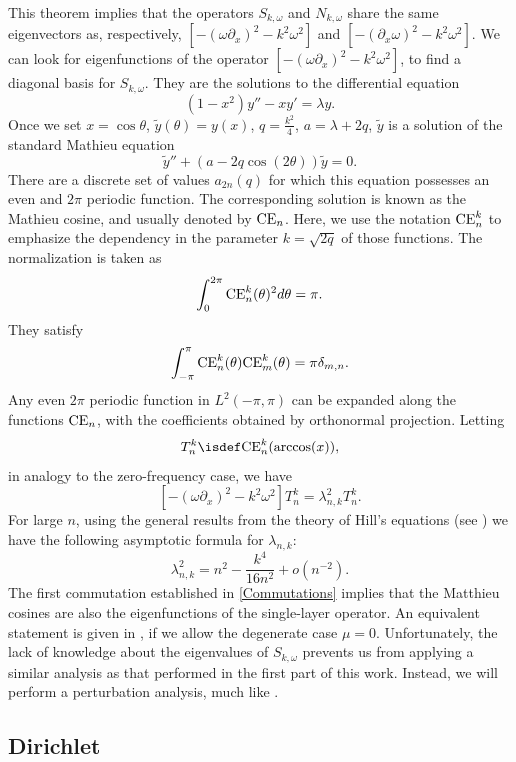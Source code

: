 \documentclass[a4paper]{article}
\begin{document}
	This theorem implies that the operators $S_{k,\omega}$ and $N_{k,\omega}$ share the same eigenvectors as, respectively, $\left[-(\omega \partial_x)^2 - k^2\omega^2\right]$ and $ \left[-(\partial_x \omega)^2 - k^2\omega^2\right]$. We can look for eigenfunctions of the operator $\left[ -(\omega \partial_x)^2 - k^2\omega^2\right]$, to find a diagonal basis for $S_{k,\omega}$. They are the solutions to the differential equation 
	\[ (1-x^2) y'' - x y' = \lambda y.\]
	Once we set $x = \cos \theta$, $\tilde{y}(\theta) = y(x)$,  $q = \frac{k^2}{4}$, $a = \lambda + 2q$, $\tilde{y}$ is a solution of the standard Mathieu equation 
	\[\tilde{y}'' + (a - 2q \cos(2\theta)) \tilde{y} = 0.\]
	There are a discrete set of values $a_{2n}(q)$ for which this equation possesses an even and $2\pi$ periodic function. The corresponding solution is known as the Mathieu cosine, and usually denoted by $\textup{CE}_n$. 	Here, we use the notation $\textup{CE}^k_n$ to emphasize the dependency in the parameter $k = \sqrt{2q}$ of those functions. The normalization is taken as
	\[ \int_{0}^{2\pi} \textup{CE}^k_n(\theta)^2 d\theta = \pi.\]
 	They satisfy
	\[ \int_{-\pi}^{\pi}\textup{CE}^k_n(\theta) \textup{CE}^k_m(\theta) = \pi \delta_{m,n}.\]
	Any even $2\pi$ periodic function in $L^2(-\pi,\pi)$ can be expanded along the functions $\textup{CE}_n$, with the coefficients obtained by orthonormal projection. Letting 
	\[T_{n}^k \isdef \textup{CE}^k_n(\arccos(x)),\]
	in analogy to the zero-frequency case, we have
	\[\left[-(\omega \partial_x)^2 - k^2\omega^2\right] T_{n}^k = \lambda_{n,k}^2 T_{n}^k.\]
	For large $n$, using the general results from the theory of Hill's equations (see \cite[eq. 28.29.21]{NIST:DLMF}) we have the following asymptotic formula for $\lambda_{n,k}$:
	\[ \lambda_{n,k}^2 = n^2 - \frac{k^4}{16n^2} +o \left(n^{-2}\right). \]
	The first commutation established in \autoref{Commutations} implies that the Matthieu cosines are also the eigenfunctions of the single-layer operator. An equivalent statement is given in \cite[Thm 4.2]{betcke2014spectral}, if we allow the degenerate case $\mu = 0$. Unfortunately, the lack of knowledge about the eigenvalues of $S_{k,\omega}$ prevents us from applying a similar analysis as that performed in the first part of this work. Instead, we will perform a perturbation analysis, much like \cite{bruno2012second}. 
	
	\subsection{Dirichlet}
	
\end{document}
